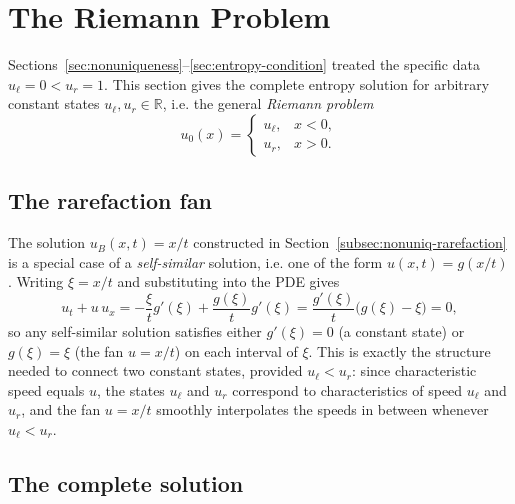 \section{The Riemann Problem}
\label{sec:riemann-problem}

Sections~\ref{sec:nonuniqueness}--\ref{sec:entropy-condition} treated the
specific data $u_\ell=0<u_r=1$. This section gives the complete entropy
solution for arbitrary constant states $u_\ell, u_r \in \mathbb{R}$, i.e.
the general \emph{Riemann problem}
\begin{equation}
  \label{eq:general-riemann-data}
  u_0(x) = \begin{cases} u_\ell, & x<0, \\ u_r, & x>0. \end{cases}
\end{equation}

\subsection{The rarefaction fan}
\label{subsec:rarefaction-general}

The solution $u_B(x,t)=x/t$ constructed in
Section~\ref{subsec:nonuniq-rarefaction} is a special case of a
\emph{self-similar} solution, i.e. one of the form $u(x,t)=g(x/t)$.
Writing $\xi = x/t$ and substituting into the PDE gives
\begin{equation}
  u_t + u\,u_x = -\frac{\xi}{t}g'(\xi) + \frac{g(\xi)}{t}g'(\xi)
  = \frac{g'(\xi)}{t}\big(g(\xi)-\xi\big) = 0,
\end{equation}
so any self-similar solution satisfies either $g'(\xi)=0$ (a constant
state) or $g(\xi)=\xi$ (the fan $u=x/t$) on each interval of $\xi$. This
is exactly the structure needed to connect two constant states, provided
$u_\ell < u_r$: since characteristic speed equals $u$, the states
$u_\ell$ and $u_r$ correspond to characteristics of speed $u_\ell$ and
$u_r$, and the fan $u=x/t$ smoothly interpolates the speeds in between
whenever $u_\ell<u_r$.

\subsection{The complete solution}
\label{subsec:riemann-complete}

